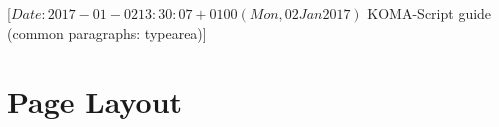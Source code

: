 %
%
%
%
%
%
%
%
% 
%
%
%
%

                 [$Date: 2017-01-02 13:30:07 +0100 (Mon, 02 Jan 2017) $
                  KOMA-Script guide (common paragraphs: typearea)]


\section{Page Layout}
\BeginIndexGroup
{}

